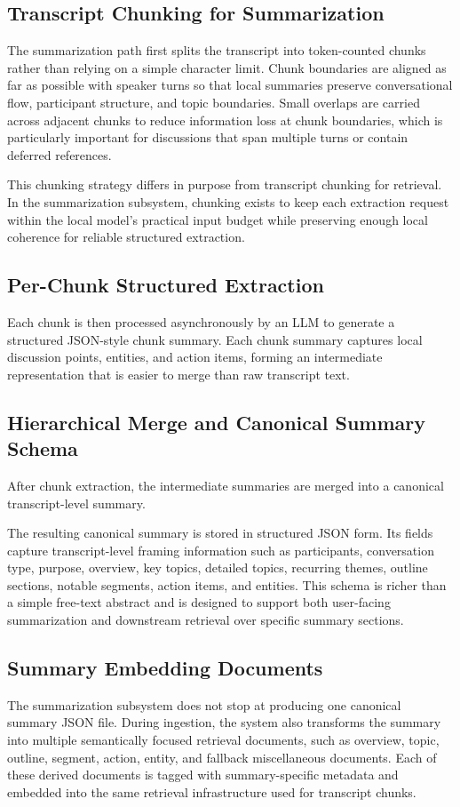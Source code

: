 \subsection{Transcript Chunking for Summarization}
The summarization path first splits the transcript into token-counted chunks rather than relying on a simple character limit. Chunk boundaries are aligned as far as possible with speaker turns so that local summaries preserve conversational flow, participant structure, and topic boundaries. Small overlaps are carried across adjacent chunks to reduce information loss at chunk boundaries, which is particularly important for discussions that span multiple turns or contain deferred references.

This chunking strategy differs in purpose from transcript chunking for retrieval. In the summarization subsystem, chunking exists to keep each extraction request within the local model's practical input budget while preserving enough local coherence for reliable structured extraction.

\subsection{Per-Chunk Structured Extraction}
Each chunk is then processed asynchronously by an LLM to generate a structured JSON-style chunk summary. Each chunk summary captures local discussion points, entities, and action items, forming an intermediate representation that is easier to merge than raw transcript text.

\subsection{Hierarchical Merge and Canonical Summary Schema}
After chunk extraction, the intermediate summaries are merged into a canonical transcript-level summary.

The resulting canonical summary is stored in structured JSON form. Its fields capture transcript-level framing information such as participants, conversation type, purpose, overview, key topics, detailed topics, recurring themes, outline sections, notable segments, action items, and entities. This schema is richer than a simple free-text abstract and is designed to support both user-facing summarization and downstream retrieval over specific summary sections.

\subsection{Summary Embedding Documents}
The summarization subsystem does not stop at producing one canonical summary JSON file. During ingestion, the system also transforms the summary into multiple semantically focused retrieval documents, such as overview, topic, outline, segment, action, entity, and fallback miscellaneous documents. Each of these derived documents is tagged with summary-specific metadata and embedded into the same retrieval infrastructure used for transcript chunks.

